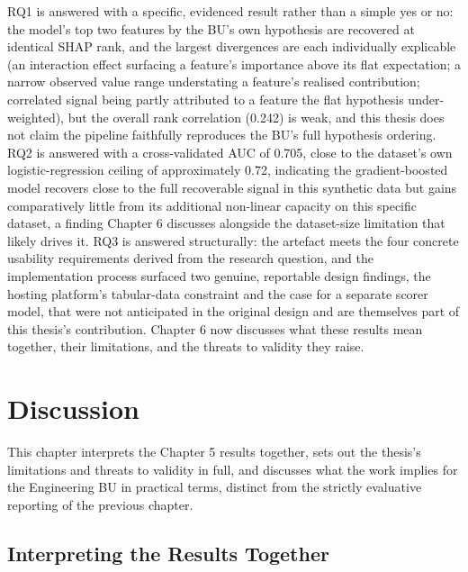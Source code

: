 \documentclass[12pt,oneside]{report}
\begin{document}
RQ1 is answered with a specific, evidenced result rather than a simple
yes or no: the model's top two features by the BU's own hypothesis are
recovered at identical SHAP rank, and the largest divergences are each
individually explicable (an interaction effect surfacing a feature's
importance above its flat expectation; a narrow observed value range
understating a feature's realised contribution; correlated signal being
partly attributed to a feature the flat hypothesis under-weighted), but
the overall rank correlation (0.242) is weak, and this thesis does not
claim the pipeline faithfully reproduces the BU's full hypothesis
ordering. RQ2 is answered with a cross-validated AUC of 0.705, close to
the dataset's own logistic-regression ceiling of approximately 0.72,
indicating the gradient-boosted model recovers close to the full
recoverable signal in this synthetic data but gains comparatively little
from its additional non-linear capacity on this specific dataset, a
finding Chapter 6 discusses alongside the dataset-size limitation that
likely drives it. RQ3 is answered structurally: the artefact meets the
four concrete usability requirements derived from the research question,
and the implementation process surfaced two genuine, reportable design
findings, the hosting platform's tabular-data constraint and the case
for a separate scorer model, that were not anticipated in the original
design and are themselves part of this thesis's contribution. Chapter 6
now discusses what these results mean together, their limitations, and
the threats to validity they raise.

\hypertarget{discussion}{%
\chapter{Discussion}\label{discussion}}

This chapter interprets the Chapter 5 results together, sets out the
thesis's limitations and threats to validity in full, and discusses what
the work implies for the Engineering BU in practical terms, distinct
from the strictly evaluative reporting of the previous chapter.

\hypertarget{interpreting-the-results-together}{%
\section{Interpreting the Results
Together}\label{interpreting-the-results-together}}
\end{document}
